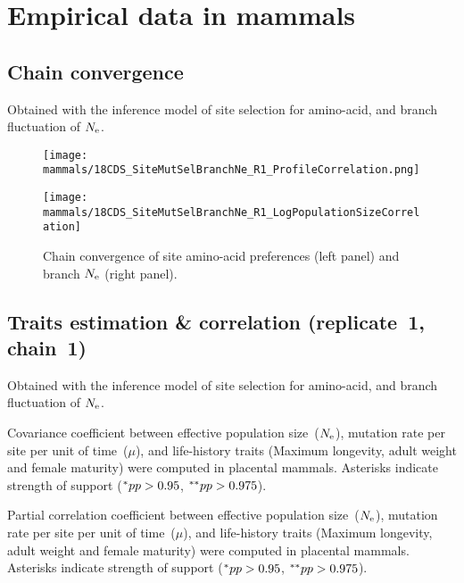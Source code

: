 \section{Empirical data in mammals}
\label{sec:empirical-data-in-mammals}

\subsection{Chain convergence}
\label{subsec:chain-convergence}
Obtained with the inference model of site selection for amino-acid, and branch fluctuation of $\Ne$.

\begin{figure}[H]
    \centering
    \begin{minipage}{0.49\linewidth}
        \texttt{[image: mammals/18CDS\_SiteMutSelBranchNe\_R1\_ProfileCorrelation.png]}
    \end{minipage} \hfill
    \begin{minipage}{0.49\linewidth}
        \texttt{[image: mammals/18CDS\_SiteMutSelBranchNe\_R1\_LogPopulationSizeCorrelation]}
    \end{minipage}
    \caption[Chain convergence of site profiles and branche $\Ne$]{
    Chain convergence of site amino-acid preferences (left panel) and branch $\Ne$ (right panel).}
\end{figure}

\subsection{Traits estimation \& correlation (replicate~1, chain~1)}
Obtained with the inference model of site selection for amino-acid, and branch fluctuation of $\Ne$.

\begin{table}[H]
    
    \caption[Covariance matrix in mammals]{
    Covariance coefficient between effective population size~($\Ne$), mutation rate per site per unit of time~($\mu$), and life-history traits (Maximum longevity, adult weight and female maturity) were computed in placental mammals.
    Asterisks indicate strength of support ($\smash{^{*}} pp > 0.95$, $\smash{^{**}} pp > 0.975$).}
\end{table}

\begin{table}[H]
    
    \caption[Partial correlation coefficient matrix in mammals]{
    Partial correlation coefficient between effective population size~($\Ne$), mutation rate per site per unit of time~($\mu$), and life-history traits (Maximum longevity, adult weight and female maturity) were computed in placental mammals.
    Asterisks indicate strength of support ($\smash{^{*}} pp > 0.95$, $\smash{^{**}} pp > 0.975$).}
    \label{tab:table-partcor-mammals}
\end{table}

